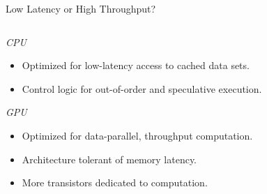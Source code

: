 \documentclass[aspectratio=43]{beamer}
\begin{document}
\begin{frame}[fragile]{Low Latency or High Throughput?}
    \begin{columns}[T]
        \begin{column}{0.6\textwidth}
            \emph{CPU}
            \begin{itemize}
                \item   Optimized for low-latency access to cached data sets.
                \item   Control logic for out-of-order and speculative execution.
            \end{itemize}

            \vspace{0.75cm}

            \emph{GPU}
            \begin{itemize}
                \item   Optimized for data-parallel, throughput computation.
                \item   Architecture tolerant of memory latency.
                \item   More transistors dedicated to computation.
            \end{itemize}
        \end{column}


\end{columns}
\end{frame}
\end{document}
